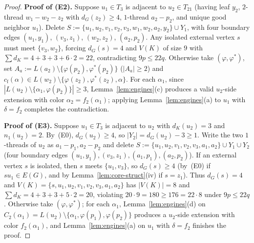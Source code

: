 \documentclass[11pt,a4paper]{article}
\theoremstyle{definition}
\begin{document}
\begin{proof}
\medskip
\noindent\textbf{Proof of (E2).} Suppose $u_1 \in T_3$ is adjacent to $u_2 \in T_{21}$ (having leaf $y_2$, $2$-thread $w_1 - w_2 - z_2$ with $d_G(z_2) \ge 4$, $1$-thread $a_2 - p_2$, and unique good neighbor $u_1$). Delete $S := \{u_1, u_2, v_1, v_2, v_3, w_1, w_2, a_2, y_2\} \cup Y_1$, with four boundary edges $(u_1, y_1)$, $(v_3, z_1)$, $(w_2, z_2)$, $(a_2, p_2)$. Any isolated external vertex $s$ must meet $\{v_3, w_2\}$, forcing $d_G(s) = 4$ and $V(K)$ of size $9$ with $\sum d_K = 4 + 3 + 3 + 6 \cdot 2 = 22$, contradicting $9p \le 22q$. Otherwise take $(\varphi, \varphi^*)$, set $A_a := L(a_2) \setminus \{\varphi(p_2), \varphi^*(p_2)\}$ ($|A_a| \ge 2$) and $c_{\mathrm{f}}(\alpha) \in L(w_2) \setminus \{\varphi(z_2), \varphi^*(z_2), \alpha\}$. For each $\alpha_1$, since $|L(u_2) \setminus \{\alpha_1, \varphi(p_2)\}| \ge 3$, Lemma~\ref{lem:engines}(c) produces a valid $u_2$-side extension with color $\alpha_2 = f_2(\alpha_1)$; applying Lemma~\ref{lem:engines}(a) to $u_1$ with $\delta = f_2$ completes the contradiction.

\medskip
\noindent\textbf{Proof of (E3).} Suppose $u_1 \in T_3$ is adjacent to $u_2$ with $d_K(u_2) = 3$ and $n_1(u_2) = 2$. By~(E0), $d_G(u_2) \ge 4$, so $|Y_2| = d_G(u_2) - 3 \ge 1$. Write the two $1$-threads of $u_2$ as $a_1 - p_1, a_2 - p_2$ and delete $S := \{u_1, u_2, v_1, v_2, v_3, a_1, a_2\} \cup Y_1 \cup Y_2$ (four boundary edges $(u_1, y_1), (v_3, z_1), (a_1, p_1), (a_2, p_2)$). If an external vertex $s$ is isolated, then $s$ meets $\{u_1, v_3\}$, so $d_G(s) \ge 4$ (by~(E0) if $su_1 \in E(G)$, and by Lemma~\ref{lem:core-struct}(iv) if $s = z_1$). Thus $d_G(s) = 4$ and $V(K) = \{s, u_1, u_2, v_1, v_2, v_3, a_1, a_2\}$ has $|V(K)| = 8$ and $\sum d_K = 4 + 3 + 3 + 5 \cdot 2 = 20$, violating $20 \cdot 9 = 180 \ge 176 = 22 \cdot 8$ under $9p \le 22q$. Otherwise take $(\varphi, \varphi^*)$; for each $\alpha_1$, Lemma~\ref{lem:engines}(d) on $C_2(\alpha_1) = L(u_2) \setminus \{\alpha_1, \varphi(p_1), \varphi(p_2)\}$ produces a $u_2$-side extension with color $f_2(\alpha_1)$, and Lemma~\ref{lem:engines}(a) on $u_1$ with $\delta = f_2$ finishes the proof.


\end{proof}
\end{document}

